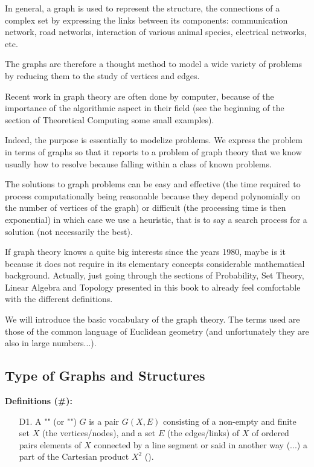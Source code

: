 {In general, a graph is used to represent the structure, the connections of a complex set by expressing the links between its components: communication network, road networks, interaction of various animal species, electrical networks, etc.

The graphs are therefore a thought method to model a wide variety of problems by reducing them to the study of vertices and edges.

Recent work in graph theory are often done by computer, because of the importance of the algorithmic aspect in their field (see the beginning of the section of Theoretical Computing some small examples).

Indeed, the purpose is essentially to modelize problems. We express the problem in terms of graphs so that it reports to a problem of graph theory that we know usually how to resolve because falling within a class of known problems.

The solutions to graph problems can be easy and effective (the time required to process computationally being reasonable because they depend polynomially on the number of vertices of the graph) or difficult (the processing time is then exponential) in which case we use a heuristic, that is to say a search process for a solution (not necessarily the best).

	If graph theory knows a quite big interests since the years 1980, maybe is it because it does not require in its elementary concepts considerable mathematical background. Actually, just going through the sections of Probability, Set Theory,  Linear Algebra and Topology presented in this book  to already feel comfortable with the different definitions.

	We will introduce the basic vocabulary of the graph theory. The terms used are those of the common language of Euclidean geometry (and unfortunately they are also in large numbers...).

	\pagebreak
	\subsection{Type of Graphs and Structures}
	\textbf{Definitions (\#\mydef):}
	\begin{enumerate}
	\item[D1.] A "" (or "") $G$ is a pair $G(X,E)$ consisting of a non-empty and finite set $X$ (the vertices/nodes), and a set $E$ (the edges/links) of $X$ of ordered pairs elements of $X$ connected by a line segment or said in another way (...) a part of the Cartesian product $X^2$ ().
	

\end{enumerate}}
